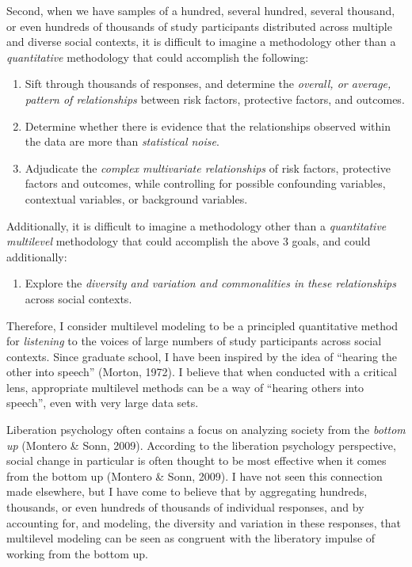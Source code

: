\documentclass[
  letterpaper,
  DIV=11,
  numbers=noendperiod]{scrreprt}
\providecommand{\tightlist}{%
  \setlength{\itemsep}{0pt}\setlength{\parskip}{0pt}}\usepackage{longtable,booktabs,array}
\begin{document}
Second, when we have samples of a hundred, several hundred, several
thousand, or even hundreds of thousands of study participants
distributed across multiple and diverse social contexts, it is difficult
to imagine a methodology other than a \emph{quantitative} methodology
that could accomplish the following:

\begin{enumerate}
\def\labelenumi{\arabic{enumi}.}
\tightlist
\item
  Sift through thousands of responses, and determine the \emph{overall,
  or average, pattern of relationships} between risk factors, protective
  factors, and outcomes.
\item
  Determine whether there is evidence that the relationships observed
  within the data are more than \emph{statistical noise}.
\item
  Adjudicate the \emph{complex multivariate relationships} of risk
  factors, protective factors and outcomes, while controlling for
  possible confounding variables, contextual variables, or background
  variables.
\end{enumerate}

Additionally, it is difficult to imagine a methodology other than a
\emph{quantitative multilevel} methodology that could accomplish the
above 3 goals, and could additionally:

\begin{enumerate}
\def\labelenumi{\arabic{enumi}.}
\setcounter{enumi}{3}
\tightlist
\item
  Explore the \emph{diversity and variation and commonalities in these
  relationships} across social contexts. 
\end{enumerate}

Therefore, I consider multilevel modeling to be a principled
quantitative method for \emph{listening} to the voices of large numbers
of study participants across social contexts.  Since
graduate school, I have been inspired by the idea of ``hearing the other
into speech'' (Morton, 1972). I believe that when conducted with a
critical lens, appropriate multilevel methods can be a way of ``hearing
others into speech'', even with very large data sets.

Liberation psychology often contains a focus on analyzing society from
the \emph{bottom up} (Montero \& Sonn, 2009). According to the
liberation psychology perspective, social change in particular is often
thought to be most effective when it comes from the bottom up (Montero
\& Sonn, 2009). I have not seen this connection made elsewhere, but I
have come to believe that by aggregating hundreds, thousands, or even
hundreds of thousands of individual responses, and by accounting for,
and modeling, the diversity and variation in these responses, that
multilevel modeling can be seen as congruent with the liberatory impulse
of working from the bottom up. 
\end{document}
